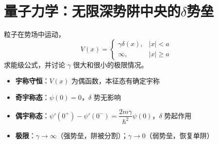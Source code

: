 \section{量子力学：无限深势阱中央的$\delta$势垒}
\label{sec:delta-barrier-well}

\begin{modelbox}
粒子在势场中运动，
\[
V(x)=\begin{cases}\gamma\delta(x),&|x|<a\\\infty,&|x|\geq a\end{cases}
\]
求能级公式，并讨论 $\gamma$ 很大和很小的极限情况。
\end{modelbox}

\begin{tipbox}[考点快速分析]
\begin{itemize}
    \item \textbf{宇称守恒}：$V(x)$ 为偶函数，本征态有确定宇称
    \item \textbf{奇宇称态}：$\psi(0)=0$，$\delta$ 势无影响
    \item \textbf{偶宇称态}：$\psi'(0^+)-\psi'(0^-)=\dfrac{2m\gamma}{\hbar^2}\psi(0)$，$\delta$ 势起作用
    \item \textbf{极限}：$\gamma\to\infty$（强势垒，阱被分割）；$\gamma\to0$（弱势垒，恢复单阱）
\end{itemize}
\end{tipbox}

